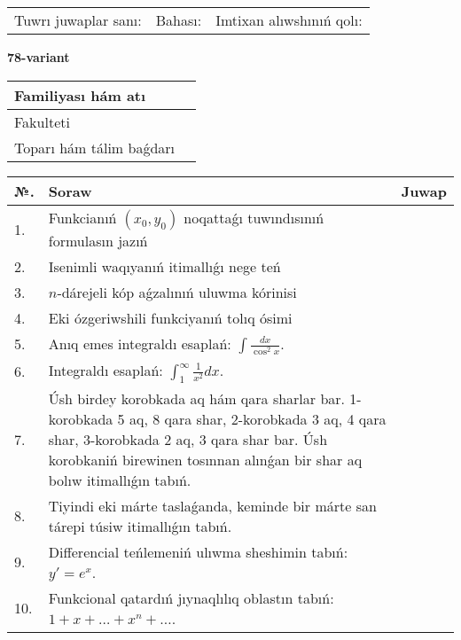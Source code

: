 \documentclass{article}
\begin{document}
\vspace{1cm}

\begin{tabular}{ c c c }
Tuwrı juwaplar sanı: \underline{\hspace{2cm}} & Bahası: \underline{\hspace{2cm}} & Imtixan alıwshınıń qolı: \underline{\hspace{2cm}} \\
\end{tabular}

\newpage

\begin{center}\textbf{78-variant}\end{center}

\bgroup
\def\arraystretch{1.5}
\begin{tabular}{ |m{6cm}|m{10cm}| }
  \hline
  Familiyası hám atı & \\
  \hline
  Fakulteti &\\
  \hline
  Toparı hám tálim baǵdarı & \\
  \hline
\end{tabular}
\egroup

\vspace{0.5cm}

\bgroup
\def\arraystretch{2}
\begin{tabular}{ |l|m{8cm}|m{7cm}| }
  \hline
  №. & Soraw & Juwap \\
  \hline
  1. & Funkcianıń $(x_{0}, y_{0})$ noqattaǵı tuwındısınıń formulasın jazıń &  \\
  \hline
  2. & Isenimli waqıyanıń itimallıǵı nege teń &  \\
  \hline
  3. & $n$-dárejeli kóp aǵzalınıń uluwma kórinisi &  \\
  \hline
  4. & Eki ózgeriwshili funkciyanıń tolıq ósimi &  \\
  \hline
  5. & Anıq emes integraldı esaplań: $\displaystyle\int \frac{dx}{\cos^{2}x}$. &  \\
  \hline
  6. & Integraldı esaplań: $\displaystyle\int_{1}^{\infty}{\frac{1}{x^{2}}dx}$. &  \\
  \hline
  7. & Úsh birdey korobkada aq hám qara sharlar bar. 1-korobkada 5 aq, 8 qara shar, 2-korobkada 3 aq, 4 qara shar, 3-korobkada 2 aq, 3 qara shar bar. Úsh korobkaniń birewinen tosınnan alınǵan bir shar aq bolıw itimallıǵın tabıń. &  \\
  \hline
  8. & Tiyindi eki márte taslaǵanda, keminde bir márte san tárepi túsiw itimallıǵın tabıń. &  \\
  \hline
  9. & Differencial teńlemeniń ulıwma sheshimin tabıń: $y'=e^{x}$. &  \\
  \hline
  10. & Funkcional qatardıń jıynaqlılıq oblastın tabıń: $1 + x + \ldots + x^{n} + \ldots$. &  \\
  \hline
\end{tabular}
\egroup
\end{document}
